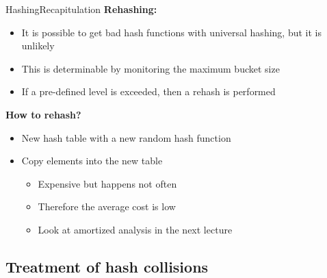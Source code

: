 \begin{frame}{Hashing}{Recapitulation}
  \textbf{Rehashing:}
  \begin{itemize}
    \item<2->
      It is possible to get bad hash functions with universal hashing, but it
      is unlikely
    \item<3->
      This is determinable by monitoring the maximum bucket size

    \item<4-> If a pre-defined level is exceeded, then a {\color{MainA}rehash} is performed
  \end{itemize}
  \textbf{How to rehash?}
  \begin{itemize}
    \item<5->
      New hash table with a new random hash function
    \item<6->
      Copy elements into the new table
      \begin{itemize}
        \item<7->
          Expensive but happens not often
        \item<8->
          Therefore the average cost is low
        \item<9->
          Look at {\color{MainA}amortized analysis} in the next lecture
      \end{itemize}
  \end{itemize}
\end{frame}


\subsection{Treatment of hash collisions}

